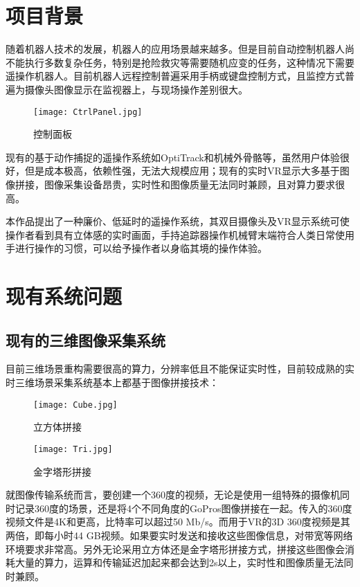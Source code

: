 \chapter{项目背景}

随着机器人技术的发展，机器人的应用场景越来越多。但是目前自动控制机器人尚不能执行多数复杂任务，特别是抢险救灾等需要随机应变的任务，这种情况下需要遥操作机器人。目前机器人远程控制普遍采用手柄或键盘控制方式，且监控方式普遍为摄像头图像显示在监视器上，与现场操作差别很大。


\begin{figure}[htbp]
\centering
\texttt{[image: CtrlPanel.jpg]}
\caption{控制面板} 
\label{fig:xfig1}
\end{figure}

现有的基于动作捕捉的遥操作系统如OptiTrack和机械外骨骼等，虽然用户体验很好，但是成本极高，依赖性强，无法大规模应用；现有的实时VR显示大多基于图像拼接，图像采集设备昂贵，实时性和图像质量无法同时兼顾，且对算力要求很高。

本作品提出了一种廉价、低延时的遥操作系统，其双目摄像头及VR显示系统可使操作者看到具有立体感的实时画面，手持追踪器操作机械臂末端符合人类日常使用手进行操作的习惯，可以给予操作者以身临其境的操作体验。


\chapter{现有系统问题}

\section{现有的三维图像采集系统}

目前三维场景重构需要很高的算力，分辨率低且不能保证实时性，目前较成熟的实时三维场景采集系统基本上都基于图像拼接技术：

\begin{figure}
\begin{minipage}{0.48\textwidth}
  \centering
  \texttt{[image: Cube.jpg]}
  \caption{立方体拼接}
  \label{fig:p1}
\end{minipage}\hfill
\begin{minipage}{0.48\textwidth}
  \centering
  \texttt{[image: Tri.jpg]}
  \caption{金字塔形拼接}
  \label{fig:p2}
\end{minipage}
\end{figure}

就图像传输系统而言，要创建一个360度的视频，无论是使用一组特殊的摄像机同时记录360度的场景，还是将4个不同角度的GoPros图像拼接在一起。传入的360度视频文件是4K和更高，比特率可以超过50 Mb/s。而用于VR的3D 360度视频是其两倍，即每小时44 GB视频。如果要实时发送和接收这些图像信息，对带宽等网络环境要求非常高。另外无论采用立方体还是金字塔形拼接方式，拼接这些图像会消耗大量的算力，运算和传输延迟加起来都会达到2s以上，实时性和图像质量无法同时兼顾。

